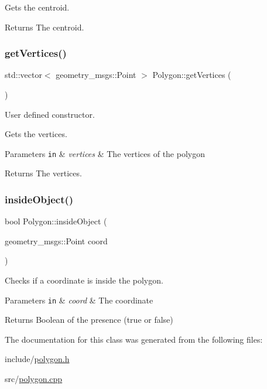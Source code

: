 Gets the centroid. 

\begin{DoxyReturn}{Returns}
The centroid. 
\end{DoxyReturn}
\mbox{\label{class_polygon_ac64090fe1e43e46d7667ffc9021878cd}} 
\subsubsection{\texorpdfstring{get\+Vertices()}{getVertices()}}
{\footnotesize\ttfamily std\+::vector$<$ geometry\+\_\+msgs\+::\+Point $>$ Polygon\+::get\+Vertices (\begin{DoxyParamCaption}{ }\end{DoxyParamCaption})}



User defined constructor. 

Gets the vertices.


\begin{DoxyParams}[1]{Parameters}
\mbox{\tt in}  & {\em vertices} & The vertices of the polygon\\
\hline
\end{DoxyParams}
\begin{DoxyReturn}{Returns}
The vertices. 
\end{DoxyReturn}
\mbox{\label{class_polygon_a44c9c10e84f1fa82da3f9353b8961462}} 
\subsubsection{\texorpdfstring{inside\+Object()}{insideObject()}}
{\footnotesize\ttfamily bool Polygon\+::inside\+Object (\begin{DoxyParamCaption}\item[{geometry\+\_\+msgs\+::\+Point}]{coord }\end{DoxyParamCaption})}



Checks if a coordinate is inside the polygon. 


\begin{DoxyParams}[1]{Parameters}
\mbox{\tt in}  & {\em coord} & The coordinate\\
\hline
\end{DoxyParams}
\begin{DoxyReturn}{Returns}
Boolean of the presence (true or false) 
\end{DoxyReturn}


The documentation for this class was generated from the following files\+:\begin{DoxyCompactItemize}
\item 
include/\hyperlink{polygon_8h}{polygon.\+h}\item 
src/\hyperlink{polygon_8cpp}{polygon.\+cpp}\end{DoxyCompactItemize}
